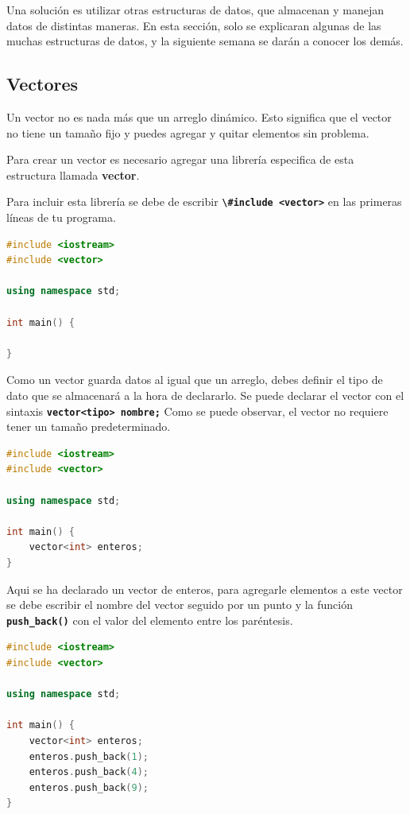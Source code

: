 \documentclass{article}
\begin{document}
Una solución es utilizar otras estructuras de datos, que almacenan y manejan datos de distintas maneras. En esta sección, solo se explicaran algunas de las muchas estructuras de datos, y la siguiente semana se darán a conocer los demás.

\subsection{Vectores}

Un vector no es nada más que un arreglo dinámico. Esto significa que el vector no tiene un tamaño fijo y puedes agregar y quitar elementos sin problema.

Para crear un vector es necesario agregar una librería especifica de esta estructura llamada \textbf{vector}.

Para incluir esta librería se debe de escribir \textbf{\lstinline{\#include <vector>}} en las primeras líneas de tu programa.

\begin{lstlisting}[language=C++, title=Vectores]
#include <iostream>
#include <vector>

using namespace std;

int main() {

}
\end{lstlisting}

Como un vector guarda datos al igual que un arreglo, debes definir el tipo de dato que se almacenará a la hora de declararlo. Se puede declarar el vector con el sintaxis \textbf{\lstinline{vector<tipo> nombre;}} Como se puede observar, el vector no requiere tener un tamaño predeterminado.

\begin{lstlisting}[language=C++, title=Vectores]
#include <iostream>
#include <vector>

using namespace std;

int main() {
	vector<int> enteros;
}
\end{lstlisting}

Aqui se ha declarado un vector de enteros, para agregarle elementos a este vector se debe escribir el nombre del vector seguido por un punto y la función \textbf{\lstinline{push_back()}} con el valor del elemento entre los paréntesis.

\begin{lstlisting}[language=C++, title=Agregando valores]
#include <iostream>
#include <vector>

using namespace std;

int main() {
	vector<int> enteros;
	enteros.push_back(1);
	enteros.push_back(4);
	enteros.push_back(9);
}
\end{lstlisting}
\end{document}
